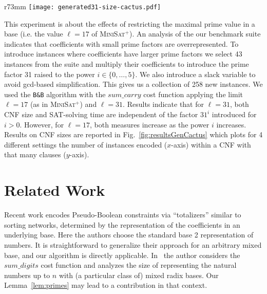 \documentclass[envcountsame]{llncs}
\newcommand\minisatp{\textsc{MiniSat$^+$}}
\newcommand{\sumCarry}{\mathit{sum\_carry}}
\newcommand{\sumDigits}{\mathit{sum\_digits}}
\begin{document}
\begin{wrapfigure}{r}{73mm}\vspace{0mm}
  \texttt{[image: generated31-size-cactus.pdf]}
  \vspace{-4ex}
  \caption{\small
Experiment 4:  Number ($x$-axis) of instances encoded within
    number of clauses ($y$-axis) on 4 configurations. From top line
    to bottom: (yellow) $\ell=17$, $i=5$, (red) $\ell=17$, $i=2$,
    (green) $\ell=31$, $i=5$, and (blue) $\ell\in\{17,31\}$, $i=0$.}
\label{fig:resultsGenCactus}
\vspace{-4ex}
\end{wrapfigure}
This experiment is about the effects of restricting the maximal prime
value in a base (i.e. the value $\ell=17$ of \minisatp).
An analysis of the our benchmark suite indicates that coefficients
with small prime factors are overrepresented.
To introduce instances where coefficients have larger prime factors we
select 43 instances from the suite and multiply their coefficients to
introduce the prime factor 31 raised to the power $i \in
\{0,\ldots,5\}$. We also introduce a slack
variable 
to avoid gcd-based simplification.
This gives us a collection of 258 new instances.
We used the \texttt{B\&B} algorithm
with the $\sumCarry$ cost function applying the limit $\ell=17$ (as in
\minisatp) and $\ell=31$.
Results indicate that for $\ell=31$, both CNF size
and
SAT-solving time are independent of the factor $31^i$ introduced for
$i>0$. However, for $\ell=17$, both measures increase as the power
$i$ increases. Results on CNF sizes are reported in Fig.\
\ref{fig:resultsGenCactus} which plots for 4 different settings the
number of instances encoded ($x$-axis) within a CNF with that many
clauses ($y$-axis). 
















\section{Related Work}\label{relwork}

Recent work \cite{BailleuxBR09} encodes Pseudo-Boolean constraints via
``totalizers'' similar to sorting networks, determined by the
representation of the coefficients in an underlying base.  Here the
authors choose the standard base 2 representation of numbers. It is
straightforward to generalize their approach for an arbitrary mixed
base, and our algorithm is directly applicable.
In~\cite{Sidorov99} the author considers the $\sumDigits$ cost
function and analyzes the size of representing the natural numbers up
to $n$ with (a particular class of) mixed radix bases.  
Our Lemma~\ref{lem:primes} may lead to a contribution in that context.
\end{document}
